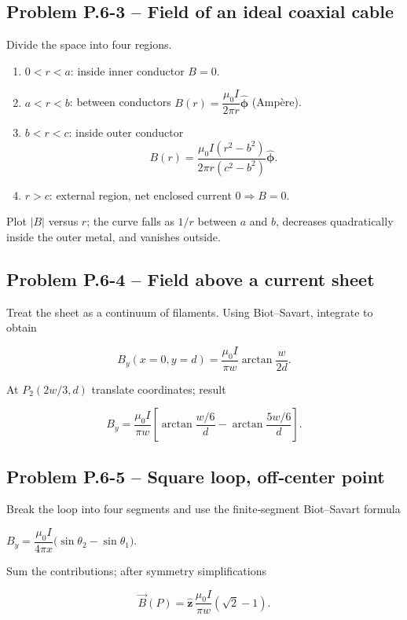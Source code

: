\documentclass[12pt]{article}
\begin{document}
\bigskip
\subsection*{Problem P.6-3 – Field of an ideal coaxial cable}

Divide the space into four regions.

\begin{enumerate}
\item $0<r<a$: inside inner conductor $B=0$.
\item $a<r<b$: between conductors $B(r)=\dfrac{\mu_0 I}{2\pi r}\hat{\boldsymbol\phi}$ \quad (Ampère).
\item $b<r<c$: inside outer conductor  
      \[
      B(r)=\frac{\mu_0 I(r^2-b^2)}{2\pi r(c^2-b^2)}\hat{\boldsymbol\phi}.
      \]
\item $r>c$: external region, net enclosed current $0\Rightarrow B=0$.
\end{enumerate}

Plot $|B|$ versus $r$; the curve falls as $1/r$ between $a$ and $b$, decreases quadratically inside the outer metal, and vanishes outside.

\bigskip
\subsection*{Problem P.6-4 – Field above a current sheet}

Treat the sheet as a continuum of filaments.  Using Biot–Savart, integrate to obtain  

\[
B_y(x=0,y=d)=\frac{\mu_0I}{\pi w}\arctan\!\frac{w}{2d}.
\]

At $P_2(2w/3,d)$ translate coordinates; result  

\[
B_y=\frac{\mu_0 I}{\pi w}\left[\arctan\!\frac{w/6}{d}-\arctan\!\frac{5w/6}{d}\right].
\]

\bigskip
\subsection*{Problem P.6-5 – Square loop, off‑center point}

Break the loop into four segments and use the finite‑segment Biot–Savart formula  

$B_y=\dfrac{\mu_0 I}{4\pi x}\bigl(\sin\theta_2-\sin\theta_1\bigr)$.

Sum the contributions; after symmetry simplifications

\[
\vec B(P)=\hat{\mathbf z}\,\frac{\mu_0I}{\pi w}\left(\sqrt2-1\right).
\]
\end{document}
